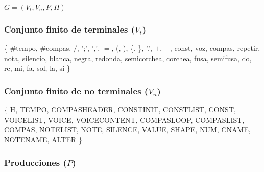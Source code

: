 $G = (V_{t}, V_{n}, P, H)$ 

\subsubsection{Conjunto finito de terminales ($V_{t}$)}

\{ \#tempo, \#compas, $/$, ';', ',', $=$, (, ), \{, \}, '.', $+$, $-$, const, voz, compas, repetir, nota, silencio, blanca, negra, redonda, semicorchea, corchea, fusa, semifusa, do, re, mi, fa, sol, la, si \}

\subsubsection{Conjunto finito de no terminales ($V_{n}$)}

\{ H, TEMPO, COMPASHEADER, CONSTINIT, CONSTLIST, CONST, VOICELIST, VOICE, VOICECONTENT, COMPASLOOP, COMPASLIST, COMPAS, NOTELIST, NOTE, SILENCE, VALUE, SHAPE, NUM, CNAME, NOTENAME, ALTER \}

\subsubsection{Producciones ($P$)}

